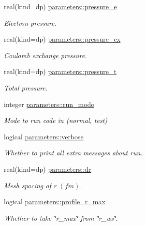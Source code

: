 \begin{DoxyCompactItemize}
real(kind=dp) \mbox{\hyperlink{group__WS__PROPERTIES_ga72c16e4c25186b788d7d47eb8c87c3a4}{parameters\+::pressure\+\_\+e}}
\begin{DoxyCompactList}\small\item\em Electron pressure. \end{DoxyCompactList}\item 
real(kind=dp) \mbox{\hyperlink{group__WS__PROPERTIES_gab531cc7fbabd91f11cc2be7385cb5854}{parameters\+::pressure\+\_\+ex}}
\begin{DoxyCompactList}\small\item\em Coulomb exchange pressure. \end{DoxyCompactList}\item 
real(kind=dp) \mbox{\hyperlink{group__WS__PROPERTIES_gaf485019c788a68c4915fca156d59baa1}{parameters\+::pressure\+\_\+t}}
\begin{DoxyCompactList}\small\item\em Total pressure. \end{DoxyCompactList}\item 
integer \mbox{\hyperlink{group__INPUT__PARS_ga2b7774a07afe51f9f1e547e3104833e4}{parameters\+::run\+\_\+mode}}
\begin{DoxyCompactList}\small\item\em Mode to run code in (normal, test) \end{DoxyCompactList}\item 
logical \mbox{\hyperlink{group__INPUT__PARS_ga552f372a0ff4dff467424c48bedd6b49}{parameters\+::verbose}}
\begin{DoxyCompactList}\small\item\em Whether to print all extra messages about run. \end{DoxyCompactList}\item 
real(kind=dp) \mbox{\hyperlink{group__INPUT__PARS_gaa5f574e72af23ebd482368e0a7232ea1}{parameters\+::dr}}
\begin{DoxyCompactList}\small\item\em Mesh spacing of r $(fm)$. \end{DoxyCompactList}\item 
logical \mbox{\hyperlink{group__INPUT__PARS_ga4f6d2343db9c28bfad5b376839f279d7}{parameters\+::profile\+\_\+r\+\_\+max}}
\begin{DoxyCompactList}\small\item\em Whether to take \char`\"{}r\+\_\+max\char`\"{} from \char`\"{}r\+\_\+ws\char`\"{}. \end{DoxyCompactList}\item 

\end{DoxyCompactItemize}
